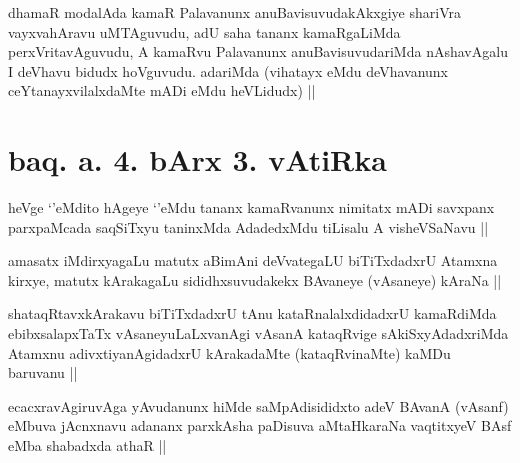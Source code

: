 
\begin{artha}
dhamaR modalAda kamaR Palavanunx anuBavisuvudakAkxgiye shariVra vayxvahAravu uMTAguvudu, adU saha tananx kamaRgaLiMda perxVritavAguvudu, A kamaRvu Palavanunx anuBavisuvudariMda nAshavAgalu I deVhavu bidudx hoVguvudu. adariMda (vihatayx eMdu deVhavanunx ceYtanayxvilalxdaMte mADi eMdu heVLidudx) ||
\end{artha}

\section*{baq. a. 4. bArx 3. vAtiRka}


\begin{artha}
heVge `\stext'eMdito hAgeye `\stext'eMdu tananx kamaRvanunx nimitatx mADi savxpanx parxpaMcada saqSiTxyu taninxMda AdadedxMdu tiLisalu A visheVSaNavu || 
\end{artha}


\begin{artha}
amasatx iMdirxyagaLu matutx aBimAni deVvategaLU biTiTxdadxrU Atamxna kirxye, matutx kArakagaLu sididhxsuvudakekx BAvaneye (vAsaneye) kAraNa ||
\end{artha}


\begin{artha}
shataqRtavxkArakavu biTiTxdadxrU tAnu kataRnalalxdidadxrU kamaRdiMda ebibxsalapxTaTx vAsaneyuLaLxvanAgi vAsanA kataqRvige sAkiSxyAdadxriMda Atamxnu adivxtiyanAgidadxrU kArakadaMte (kataqRvinaMte) kaMDu baruvanu ||
\end{artha}


\begin{artha}
ecacxravAgiruvAga yAvudanunx hiMde saMpAdisididxto adeV BAvanA (vAsanf) eMbuva jAcnxnavu adananx parxkAsha paDisuva aMtaHkaraNa vaqtitxyeV BAsf eMba shabadxda athaR ||
\end{artha}
